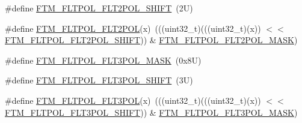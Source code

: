 \begin{DoxyCompactItemize}
\#define \mbox{\hyperlink{group___f_t_m___register___masks_gadf4358730058b9bf99f5e8cfde4bd482}{F\+T\+M\+\_\+\+F\+L\+T\+P\+O\+L\+\_\+\+F\+L\+T2\+P\+O\+L\+\_\+\+S\+H\+I\+FT}}~(2\+U)
\item 
\#define \mbox{\hyperlink{group___f_t_m___register___masks_gaeb97f9dbdbf6c1686cb47385ddf34186}{F\+T\+M\+\_\+\+F\+L\+T\+P\+O\+L\+\_\+\+F\+L\+T2\+P\+OL}}(x)~(((uint32\+\_\+t)(((uint32\+\_\+t)(x)) $<$$<$ \mbox{\hyperlink{group___f_t_m___register___masks_gadf4358730058b9bf99f5e8cfde4bd482}{F\+T\+M\+\_\+\+F\+L\+T\+P\+O\+L\+\_\+\+F\+L\+T2\+P\+O\+L\+\_\+\+S\+H\+I\+FT}})) \& \mbox{\hyperlink{group___f_t_m___register___masks_ga0810edda6aa6e4a53808b33db2049072}{F\+T\+M\+\_\+\+F\+L\+T\+P\+O\+L\+\_\+\+F\+L\+T2\+P\+O\+L\+\_\+\+M\+A\+SK}})
\item 
\#define \mbox{\hyperlink{group___f_t_m___register___masks_ga56880809c7351258a92bf4f55b1b43d0}{F\+T\+M\+\_\+\+F\+L\+T\+P\+O\+L\+\_\+\+F\+L\+T3\+P\+O\+L\+\_\+\+M\+A\+SK}}~(0x8\+U)
\item 
\#define \mbox{\hyperlink{group___f_t_m___register___masks_gaf5b8746ad3ae33f546df51f36e833b44}{F\+T\+M\+\_\+\+F\+L\+T\+P\+O\+L\+\_\+\+F\+L\+T3\+P\+O\+L\+\_\+\+S\+H\+I\+FT}}~(3\+U)
\item 
\#define \mbox{\hyperlink{group___f_t_m___register___masks_ga3f0dd548b377ac411ed455073958f9bd}{F\+T\+M\+\_\+\+F\+L\+T\+P\+O\+L\+\_\+\+F\+L\+T3\+P\+OL}}(x)~(((uint32\+\_\+t)(((uint32\+\_\+t)(x)) $<$$<$ \mbox{\hyperlink{group___f_t_m___register___masks_gaf5b8746ad3ae33f546df51f36e833b44}{F\+T\+M\+\_\+\+F\+L\+T\+P\+O\+L\+\_\+\+F\+L\+T3\+P\+O\+L\+\_\+\+S\+H\+I\+FT}})) \& \mbox{\hyperlink{group___f_t_m___register___masks_ga56880809c7351258a92bf4f55b1b43d0}{F\+T\+M\+\_\+\+F\+L\+T\+P\+O\+L\+\_\+\+F\+L\+T3\+P\+O\+L\+\_\+\+M\+A\+SK}})
\end{DoxyCompactItemize}
